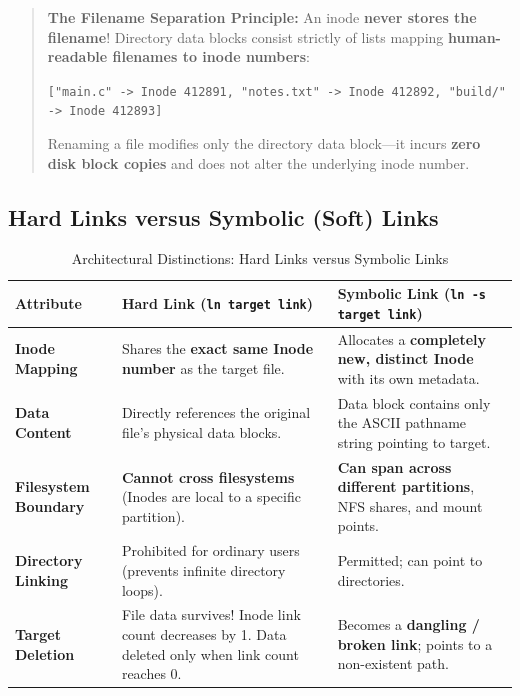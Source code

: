 \begin{quote}
\textbf{The Filename Separation Principle:} An inode \textbf{never stores the filename}! Directory data blocks consist strictly of lists mapping \textbf{human-readable filenames to inode numbers}:
\begin{center}
\texttt{["main.c" -> Inode 412891, "notes.txt" -> Inode 412892, "build/" -> Inode 412893]}
\end{center}
Renaming a file modifies only the directory data block—it incurs \textbf{zero disk block copies} and does not alter the underlying inode number.
\end{quote}

\subsection{Hard Links versus Symbolic (Soft) Links}
\begin{table}[htbp]
\centering
\small
\caption{Architectural Distinctions: Hard Links versus Symbolic Links}
\label{tab:hard_vs_soft_links}
\begin{tabularx}{\textwidth}{l p{5cm} X}
\toprule
\textbf{Attribute} & \textbf{Hard Link (\texttt{ln target link})} & \textbf{Symbolic Link (\texttt{ln -s target link})} \\
\midrule
\textbf{Inode Mapping} & Shares the \textbf{exact same Inode number} as the target file. & Allocates a \textbf{completely new, distinct Inode} with its own metadata. \\
\textbf{Data Content} & Directly references the original file's physical data blocks. & Data block contains only the ASCII pathname string pointing to target. \\
\textbf{Filesystem Boundary} & \textbf{Cannot cross filesystems} (Inodes are local to a specific partition). & \textbf{Can span across different partitions}, NFS shares, and mount points. \\
\textbf{Directory Linking} & Prohibited for ordinary users (prevents infinite directory loops). & Permitted; can point to directories. \\
\textbf{Target Deletion} & File data survives! Inode link count decreases by 1. Data deleted only when link count reaches 0. & Becomes a \textbf{dangling / broken link}; points to a non-existent path. \\
\bottomrule
\end{tabularx}
\end{table}

